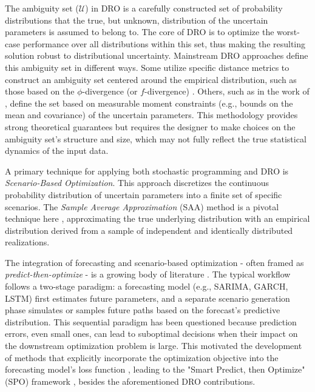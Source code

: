 \documentclass[a4paper,fleqn,3p,11pt,authoryear]{cas-sc}
\begin{document}
The ambiguity set ($\mathcal{U}$) in DRO is a carefully constructed set of probability distributions that the true, but unknown, distribution of the uncertain parameters is assumed to belong to. The core of DRO is to optimize the worst-case performance over all distributions within this set, thus making the resulting solution robust to distributional uncertainty. Mainstream DRO approaches define this ambiguity set in different ways. Some utilize specific distance metrics to construct an ambiguity set centered around the empirical distribution, such as those based on the $\phi$-divergence (or $f$-divergence) \citep{BK19}. Others, such as in the work of \citet{EK17}, define the set based on measurable moment constraints (e.g., bounds on the mean and covariance) of the uncertain parameters. This methodology provides strong theoretical guarantees but requires the designer to make choices on the ambiguity set's structure and size, which may not fully reflect the true statistical dynamics of the input data.

A primary technique for applying both stochastic programming and DRO is {\it Scenario-Based Optimization}. This approach discretizes the continuous probability distribution of uncertain parameters into a finite set of specific scenarios. The {\it Sample Average Approximation} (SAA) method is a pivotal technique here \citep{SH98}, approximating the true underlying distribution with an empirical distribution derived from a sample of independent and identically distributed realizations.

The integration of forecasting and scenario-based optimization - often framed as {\it predict-then-optimize} - is a growing body of literature \citep{BK19,R18}. The typical workflow follows a two-stage paradigm: a forecasting model (e.g., SARIMA, GARCH, LSTM) first estimates future parameters, and a separate scenario generation phase simulates or samples future paths based on the forecast's predictive distribution. This sequential paradigm has been questioned because prediction errors, even small ones, can lead to suboptimal decisions when their impact on the downstream optimization problem is large. This motivated the development of methods that explicitly incorporate the optimization objective into the forecasting model's loss function \citep{DAK17}, leading to the "Smart Predict, then Optimize" (SPO) framework \citep{EG22}, besides the aforementioned DRO contributions.
\end{document}

